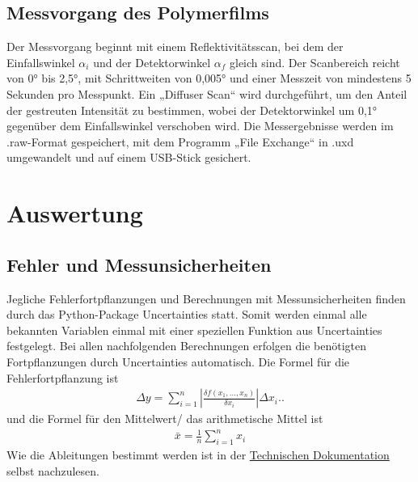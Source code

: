 \documentclass[12pt]{article}
\begin{document}
\subsection{Messvorgang des Polymerfilms}
Der Messvorgang beginnt mit einem Reflektivitätsscan, bei dem der Einfallswinkel $\alpha_i$ und der Detektorwinkel $\alpha_f$ gleich sind. Der Scanbereich reicht von 0° bis 2,5°, mit Schrittweiten von 0,005° und einer Messzeit von mindestens 5 Sekunden pro Messpunkt.
Ein „Diffuser Scan“ wird durchgeführt, um den Anteil der gestreuten Intensität zu bestimmen, wobei der Detektorwinkel um 0,1° gegenüber dem Einfallswinkel verschoben wird. Die Messergebnisse werden im .raw-Format gespeichert, mit dem Programm „File Exchange“ in .uxd umgewandelt und auf einem USB-Stick gesichert.

\section{Auswertung}\label{sec:auswertung}
\subsection{Fehler und Messunsicherheiten}\label{subsec:fehler-und-messunsicherheiten}
Jegliche Fehlerfortpflanzungen und Berechnungen mit Messunsicherheiten finden durch das Python-Package Uncertainties\cite{uncertainties} statt.
Somit werden einmal alle bekannten Variablen einmal mit einer speziellen Funktion aus Uncertainties festgelegt.
Bei allen nachfolgenden Berechnungen erfolgen die benötigten Fortpflanzungen durch Uncertainties automatisch.
Die Formel für die Fehlerfortpflanzung ist
\begin{align}
  \Delta y=\sum_{i=1}^n\left|\frac{\delta f\left(x_1, \ldots, x_n\right)}{\delta x_i}\right| \Delta x_i.\text{.}\label{gauss}
\end{align}
und die Formel für den Mittelwert/ das arithmetische Mittel ist
\begin{align}
  \bar{x}=\frac{1}{n}\sum_{i=1}^n x_i\label{mittel}
\end{align}
Wie die Ableitungen bestimmt werden ist in der \href{https://readthedocs.org/projects/uncertainties-python-package/downloads/pdf/latest/}{Technischen Dokumentation} selbst nachzulesen.
\end{document}
